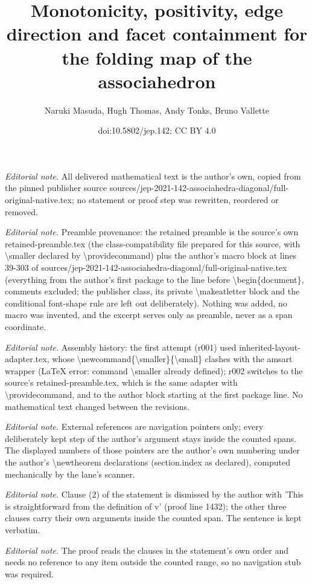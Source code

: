 \documentclass[10pt,a4paper]{amsart}
\title{Monotonicity, positivity, edge direction and facet containment for the folding map of the associahedron}
\author{Naruki Masuda, Hugh Thomas, Andy Tonks, Bruno Vallette}
\date{doi:10.5802/jep.142; CC BY 4.0}
\numberwithin{equation}{section}\providecommand{\No}{}
\theoremstyle{plain}
\theoremstyle{definition}
\begin{document}
\maketitle
\noindent\textit{Editorial note.} All delivered mathematical text is the author's own, copied from the pinned publisher source sources/jep-2021-142-associahedra-diagonal/full-original-native.tex; no statement or proof step was rewritten, reordered or removed.\par\medskip
\noindent\textit{Editorial note.} Preamble provenance: the retained preamble is the source's own retained-preamble.tex (the class-compatibility file prepared for this source, with \textbackslash{}smaller declared by \textbackslash{}providecommand) plus the author's macro block at lines 39-303 of sources/jep-2021-142-associahedra-diagonal/full-original-native.tex (everything from the author's first package to the line before \textbackslash{}begin\{document\}, comments excluded; the publisher class, its private \textbackslash{}makeatletter block and the conditional font-shape rule are left out deliberately). Nothing was added, no macro was invented, and the excerpt serves only as preamble, never as a span coordinate.\par\medskip
\noindent\textit{Editorial note.} Assembly history: the first attempt (r001) used inherited-layout-adapter.tex, whose \textbackslash{}newcommand\{\textbackslash{}smaller\}\{\textbackslash{}small\} clashes with the amsart wrapper (LaTeX error: command \textbackslash{}smaller already defined); r002 switches to the source's retained-preamble.tex, which is the same adapter with \textbackslash{}providecommand, and to the author block starting at the first package line. No mathematical text changed between the revisions.\par\medskip
\noindent\textit{Editorial note.} External references are navigation pointers only; every deliberately kept step of the author's argument stays inside the counted spans. The displayed numbers of those pointers are the author's own numbering under the author's \textbackslash{}newtheorem declarations (section.index as declared), computed mechanically by the lane's scanner.\par\medskip
\noindent\textit{Editorial note.} Clause (2) of the statement is dismissed by the author with 'This is straightforward from the definition of v' (proof line 1432); the other three clauses carry their own arguments inside the counted span. The sentence is kept verbatim.\par\medskip
\noindent\textit{Editorial note.} The proof reads the clauses in the statement's own order and needs no reference to any item outside the counted range, so no navigation stub was required.\par\medskip
\end{document}

